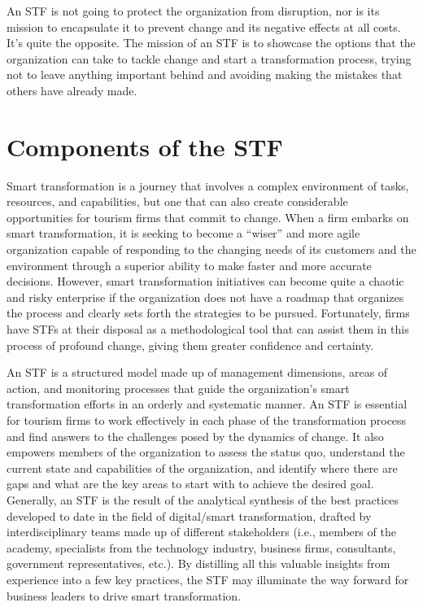 \documentclass[
  letterpaper,
  DIV=11,
  numbers=noendperiod]{scrreprt}
\begin{document}
An STF is not going to protect the organization from disruption, nor is
its mission to encapsulate it to prevent change and its negative effects
at all costs. It's quite the opposite. The mission of an STF is to
showcase the options that the organization can take to tackle change and
start a transformation process, trying not to leave anything important
behind and avoiding making the mistakes that others have already made.

\hypertarget{components-of-the-stf}{%
\section{Components of the STF}\label{components-of-the-stf}}

Smart transformation is a journey that involves a complex environment of
tasks, resources, and capabilities, but one that can also create
considerable opportunities for tourism firms that commit to change. When
a firm embarks on smart transformation, it is seeking to become a
``wiser'' and more agile organization capable of responding to the
changing needs of its customers and the environment through a superior
ability to make faster and more accurate decisions. However, smart
transformation initiatives can become quite a chaotic and risky
enterprise if the organization does not have a roadmap that organizes
the process and clearly sets forth the strategies to be pursued.
Fortunately, firms have STFs at their disposal as a methodological tool
that can assist them in this process of profound change, giving them
greater confidence and certainty.

An STF is a structured model made up of management dimensions, areas of
action, and monitoring processes that guide the organization's smart
transformation efforts in an orderly and systematic manner. An STF is
essential for tourism firms to work effectively in each phase of the
transformation process and find answers to the challenges posed by the
dynamics of change. It also empowers members of the organization to
assess the status quo, understand the current state and capabilities of
the organization, and identify where there are gaps and what are the key
areas to start with to achieve the desired goal. Generally, an STF is
the result of the analytical synthesis of the best practices developed
to date in the field of digital/smart transformation, drafted by
interdisciplinary teams made up of different stakeholders (i.e., members
of the academy, specialists from the technology industry, business
firms, consultants, government representatives, etc.). By distilling all
this valuable insights from experience into a few key practices, the STF
may illuminate the way forward for business leaders to drive smart
transformation.
\end{document}
